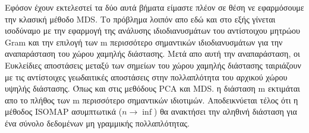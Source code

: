\par
Εφόσον έχουν εκτελεστεί τα δύο αυτά βήματα είμαστε πλέον σε θέση νε εφαρμόσουμε την κλασική μέθοδο \textlatin{MDS}\textlatin{\cite{mds}}. Το πρόβλημα λοιπόν απο εδώ και στο εξής γίνεται ισοδύναμο με την εφαρμογή της ανάλυσης ιδιοδιανυσμάτων του αντίστοιχου μητρώου \textlatin{Gram} και την επιλογή των \textlatin{m} περισσότερο σημαντικών ιδιοδιανυσμάτων για την αναπαράσταση του χώρου χαμηλής διάστασης. Μετά απο αυτή την αναπαράσταση, οι Ευκλείδιες αποστάσεις μεταξύ των σημείων του χώρου χαμηλής διάστασης ταιριάζουν με τις αντίστοιχες γεωδαιτικές αποστάσεις στην πολλαπλότητα του αρχικού χώρου υψηλής διάστασης. Όπως και στις μεθόδους \textlatin{PCA}\textlatin{\cite{pca}} και \textlatin{MDS}\textlatin{\cite{mds}}. η διάσταση \textlatin{m} εκτιμάται απο το πλήθος των \textlatin{m} περισσότερο σημαντικών ιδιοτιμών. Αποδεικνύεται τέλος ότι η μέθοδος \textlatin{ISOMAP} ασυμπτωτικά ($n \rightarrow \inf$) θα ανακτήσει την αληθινή διάσταση για ένα σύνολο δεδομένων μη γραμμικής πολλαπλότητας.

